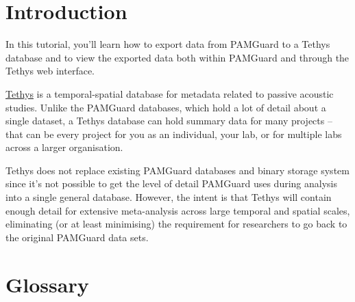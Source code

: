 \documentclass[
]{article}
\begin{document}
\section{Introduction}\label{introduction}

In this tutorial, you'll learn how to export data from PAMGuard to a
Tethys database and to view the exported data both within PAMGuard and
through the Tethys web interface.

\href{https://tethys.sdsu.edu}{Tethys} is a temporal-spatial database
for metadata related to passive acoustic studies. Unlike the PAMGuard
databases, which hold a lot of detail about a single dataset, a Tethys
database can hold summary data for many projects -- that can be every
project for you as an individual, your lab, or for multiple labs across
a larger organisation.

Tethys does not replace existing PAMGuard databases and binary storage
system since it's not possible to get the level of detail PAMGuard uses
during analysis into a single general database. However, the intent is
that Tethys will contain enough detail for extensive meta-analysis
across large temporal and spatial scales, eliminating (or at least
minimising) the requirement for researchers to go back to the original
PAMGuard data sets.

\newpage{}

\section{Glossary}\label{glossary}
\end{document}
